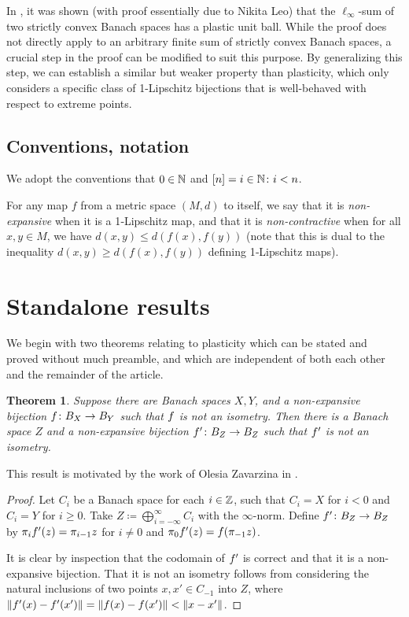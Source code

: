 \documentclass{amsart}
\newtheorem{theorem}{Theorem}[section]
\theoremstyle{definition}
\begin{document}
In \autocite{haller:2022}, it was shown (with proof essentially due to Nikita Leo)
that the $\ell_\infty$-sum of two strictly
convex Banach spaces has a plastic unit ball. While the proof does not directly apply to an arbitrary finite sum of strictly convex Banach spaces, a crucial step in the proof can be modified to suit this purpose. By generalizing this step, we can establish a similar but weaker property than plasticity, which only considers a specific class of
1-Lipschitz bijections that is well-behaved with respect to extreme points.

\subsection{Conventions, notation}

We adopt the conventions that $0 \in \mathbb{N}$ and $[n] = {i \in \mathbb{N} \colon i < n}$.

For any map $f$ from a metric space $(M,d)$ to itself,
we say that it is \textit{non-expansive} when it is a 1‑Lipschitz
map, and that it is \textit{non-contractive} when for all
$x, y \in M$, we have $d(x,y) \leq d(f(x), f(y))$ (note
that this is dual to the inequality $d(x,y) \geq d(f(x), f(y))$ defining
1‑Lipschitz maps).

\section{Standalone results}

We begin with two theorems relating to plasticity which can be stated and proved without much preamble, and which are independent of both each other and the remainder of the article.


\begin{theorem}
    Suppose there are Banach spaces $X, Y$, and a non-expansive bijection $f \colon B_X \to B_Y$ such that $f$ is not an isometry. Then there is a Banach space $Z$ and a non-expansive bijection $f' \colon B_Z \to B_Z$ such that $f'$ is not an isometry.
\end{theorem}

This result is motivated by the work of Olesia Zavarzina in \autocite{zavarzina:2017}.

\begin{proof}
    Let $C_i$ be a Banach space for each $i \in \mathbb{Z}$, such that $C_i = X$
    for $i < 0$ and $C_i = Y$ for $i \geq 0$. Take $Z \coloneqq \bigoplus_{i=-\infty}^\infty C_i$ with the $\infty$-norm. Define $f' \colon B_Z \to B_Z$ by $\pi_i f'(z) = \pi_{i-1} z$ for $i \neq 0$ and $\pi_0 f'(z) = f(\pi_{-1}z)$.
  
    It is clear by inspection that the codomain of $f'$ is correct and that it is a non-expansive bijection. That it is not an isometry follows from considering the natural inclusions of two points $x, x' \in C_{-1}$ into $Z$, where $\norm{f'(x) - f'(x')} = \norm{f(x)-f(x')} < \norm{x-x'}$.
\end{proof}
\end{document}
